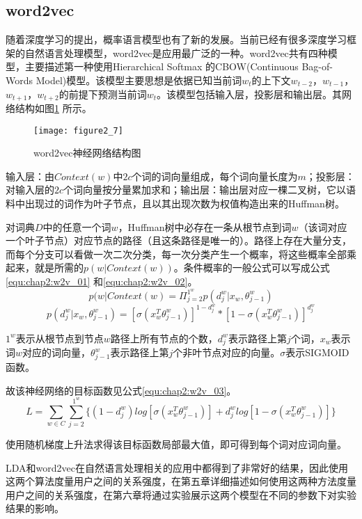 \subsection{word2vec}
随着深度学习的提出，概率语言模型也有了新的发展。当前已经有很多深度学习框架的自然语言处理模型，word2vec是应用最广泛的一种。word2vec共有四种模型，主要描述第一种使用Hierarchical Softmax 的CBOW(Continuous Bag-of-Words Model)模型。该模型主要思想是依据已知当前词$w_{t}$的上下文$w_{t-2}$，$w_{t-1}$，$w_{t+1}$，$w_{t+2}$的前提下预测当前词$w_{t}$。该模型包括输入层，投影层和输出层。其网络结构如图\ref{fig:2_7} 所示。
\begin{figure}[htp]
\centering
\texttt{[image: figure2\_7]}
\caption{word2vec神经网络结构图}
\label{fig:2_7}
\end{figure}
\par 输入层：由$Context(w)$中$2c$个词的词向量组成，每个词向量长度为$m$；投影层：对输入层的$2c$个词向量按分量累加求和；输出层：输出层对应一棵二叉树，它以语料中出现过的词作为叶子节点，且以其出现次数为权值构造出来的Huffman树。
\par 对词典$D$中的任意一个词$w$，Huffman树中必存在一条从根节点到词$w$（该词对应一个叶子节点）对应节点的路径（且这条路径是唯一的）。路径上存在大量分支，而每个分支可以看做一次二次分类，每一次分类产生一个概率，将这些概率全部乘起来，就是所需的$p(w|Context(w))$。条件概率的一般公式可以写成公式\ref{equ:chap2:w2v_01} 和\ref{equ:chap2:w2v_02}。
\begin{equation}
\label{equ:chap2:w2v_01}
p(w|Context(w)=\Pi_{j=2}^{1^{w}}p(d_{j}^{w}|x_{w},\theta_{j-1}^{w})
\end{equation}
\begin{equation}
\label{equ:chap2:w2v_02}
p(d_{j}^{w}|x_{w},\theta_{j-1}^{w})=[\sigma(x_{w}^{T}\theta_{j-1}^{w})]^{1-d_{j}^{w}}\ast[1-\sigma(x_{w}^{T}\theta_
{j-1}^{w})]^{d_{j}^{w}}
\end{equation}
\par $1^{w}$表示从根节点到节点$w$路径上所有节点的个数，$d_{j}^{w}$表示路径上第$j$个词，$x_{w}$表示词$w$对应的词向量，$\theta_{j-1}^{w}$表示路径上第$j$个非叶节点对应的向量。$\sigma$表示SIGMOID函数。
\par 故该神经网络的目标函数见公式\ref{equ:chap2:w2v_03}。
\begin{equation}
\label{equ:chap2:w2v_03}
L=\sum_{w\in C}\sum_{j=2}^{1^{w}}\{(1-d_{j}^{w})log[\sigma(x_{w}^{T}\theta_{j-1}^{w})]+d_{j}^{w}log[1-\sigma(x_{w}^{T}\theta_{j-1}^{w})]\}
\end{equation}
\par 使用随机梯度上升法求得该目标函数局部最大值，即可得到每个词对应词向量。
\par LDA和word2vec在自然语言处理相关的应用中都得到了非常好的结果，因此使用这两个算法度量用户之间的关系强度，在第五章详细描述如何使用这两种方法度量用户之间的关系强度，在第六章将通过实验展示这两个模型在不同的参数下对实验结果的影响。
